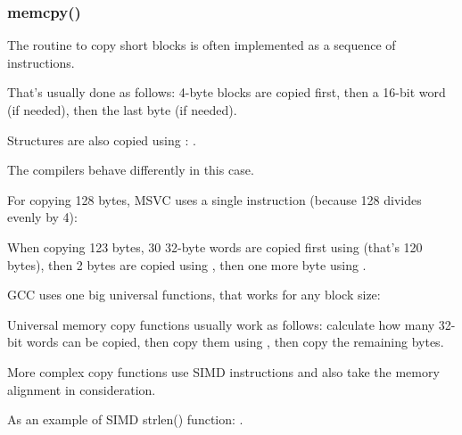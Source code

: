 \subsubsection{memcpy()}

\label{copying_short_blocks}


The routine to copy short blocks is often implemented as a sequence of \MOV instructions.








That's usually done as follows: 4-byte blocks are copied first, then a 16-bit word (if needed), 
then the last byte (if needed).

Structures are also copied using
\MOV: .


The compilers behave differently in this case.




For copying 128 bytes, MSVC uses a single  instruction (because 128 
divides evenly by 4):




When copying 123 bytes, 30 32-byte words are copied first using 
(that's 120 bytes),
then 2 bytes are copied using , 
then one more byte using .




GCC uses one big universal functions, that works for any block size:




Universal memory copy functions usually work as follows:
calculate how many 32-bit words can be copied, then copy them using , then copy
the remaining bytes.


More complex copy functions use \ac{SIMD} instructions and also take the memory alignment
in consideration.

As an example of SIMD strlen() function: .

